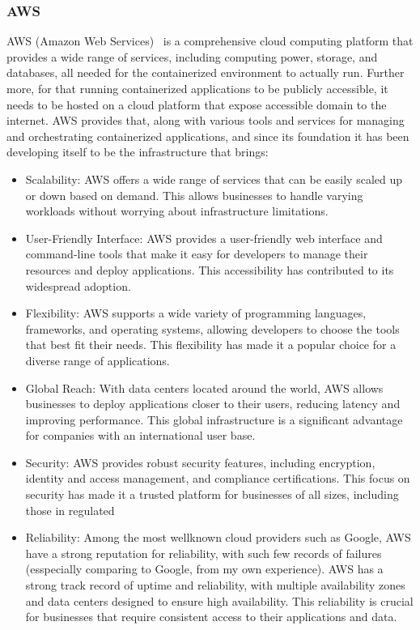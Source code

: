 \subsubsection*{AWS}
AWS (Amazon Web Services)~\cite{aws_docs} is a comprehensive cloud computing platform that provides a wide range of services, including computing power, storage, and databases, all needed for the containerized environment to actually run. Further more, for that running containerized applications to be publicly accessible, it needs to be hosted on a cloud platform that expose accessible domain to the internet. AWS provides that, along with various tools and services for managing and orchestrating containerized applications, and since its foundation it has been developing itself to be the infrastructure that brings:

\begin{itemize}
    \item {Scalability:} AWS offers a wide range of services that can be easily scaled up or down based on demand. This allows businesses to handle varying workloads without worrying about infrastructure limitations.
    \item {User-Friendly Interface:} AWS provides a user-friendly web interface and command-line tools that make it easy for developers to manage their resources and deploy applications. This accessibility has contributed to its widespread adoption.
    \item {Flexibility:} AWS supports a wide variety of programming languages, frameworks, and operating systems, allowing developers to choose the tools that best fit their needs. This flexibility has made it a popular choice for a diverse range of applications.
    \item {Global Reach:} With data centers located around the world, AWS allows businesses to deploy applications closer to their users, reducing latency and improving performance. This global infrastructure is a significant advantage for companies with an international user base.
    \item {Security:} AWS provides robust security features, including encryption, identity and access management, and compliance certifications. This focus on security has made it a trusted platform for businesses of all sizes, including those in regulated
    \item {Reliability:} Among the most well\-known cloud providers such as Google, AWS have a strong reputation for reliability, with such few records of failures (esspecially comparing to Google, from my own experience). AWS has a strong track record of uptime and reliability, with multiple availability zones and data centers designed to ensure high availability. This reliability is crucial for businesses that require consistent access to their applications and data.
\end{itemize}
